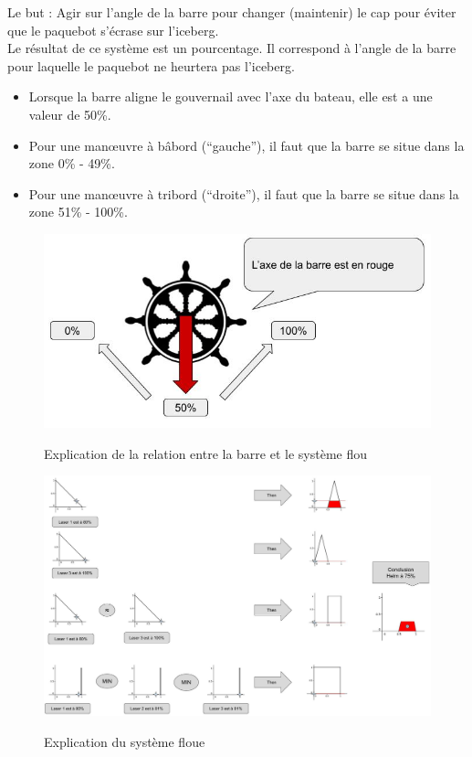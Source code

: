 \documentclass[a4paper,11pt]{article}
\begin{document}
    Le but : Agir sur l’angle de la barre pour changer (maintenir) le cap pour éviter que le paquebot s’écrase sur l’iceberg.\\
    Le résultat de ce système est un pourcentage. Il correspond à l’angle de la barre pour laquelle le paquebot ne heurtera pas l’iceberg.

    \begin{itemize}
        \item Lorsque la barre aligne le gouvernail avec l’axe du bateau, elle est a une valeur de 50\%.
        \item Pour une manœuvre à bâbord (“gauche”), il faut que la barre se situe dans la zone 0\% - 49\%.
        \item Pour une manœuvre à tribord (“droite”), il faut que la barre se situe dans la zone 51\% - 100\%.
    \end{itemize}

    \begin{figure}[H]
        \begin{center}
            \caption{Explication de la relation entre la barre et le système flou}
            \includegraphics[scale=0.6]{assets/Explications_Barre.jpg}
            \label{fig:helpBar}
        \end{center}
    \end{figure}

    \begin{figure}[H]
        \begin{center}
            \caption{Explication du système floue}
            \includegraphics[scale=0.4, angle=90]{assets/Fuzzy_System_Titanic_Helm.jpg}
            \label{fig:systemFuzzy}
        \end{center}
    \end{figure}
\end{document}
